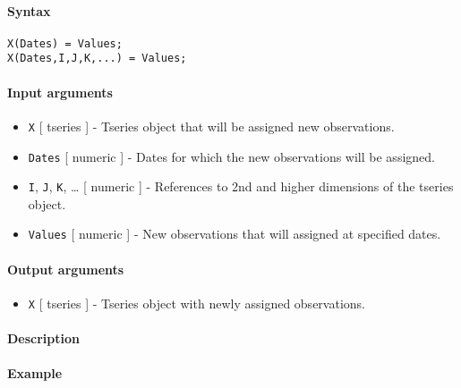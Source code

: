 


	\paragraph{Syntax}

\begin{verbatim}
X(Dates) = Values;
X(Dates,I,J,K,...) = Values;
\end{verbatim}

\paragraph{Input arguments}

\begin{itemize}
\item
  \texttt{X} {[} tseries {]} - Tseries object that will be assigned new
  observations.
\item
  \texttt{Dates} {[} numeric {]} - Dates for which the new observations
  will be assigned.
\item
  \texttt{I}, \texttt{J}, \texttt{K}, \ldots{} {[} numeric {]} -
  References to 2nd and higher dimensions of the tseries object.
\item
  \texttt{Values} {[} numeric {]} - New observations that will assigned
  at specified dates.
\end{itemize}

\paragraph{Output arguments}

\begin{itemize}
\itemsep1pt\parskip0pt
\item
  \texttt{X} {[} tseries {]} - Tseries object with newly assigned
  observations.
\end{itemize}

\paragraph{Description}

\paragraph{Example}


